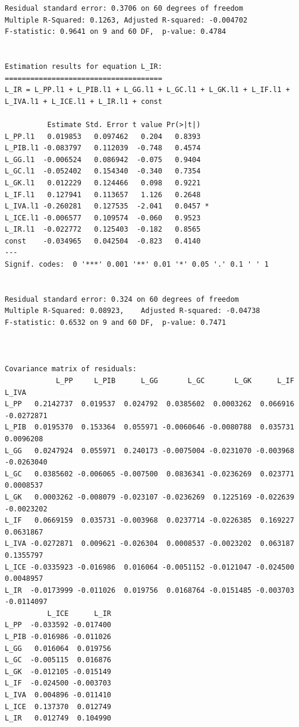 \documentclass[
  spanish,
  letterpaper,
  DIV=11,
  numbers=noendperiod]{scrartcl}
\begin{document}
\begin{verbatim}
Residual standard error: 0.3706 on 60 degrees of freedom
Multiple R-Squared: 0.1263, Adjusted R-squared: -0.004702 
F-statistic: 0.9641 on 9 and 60 DF,  p-value: 0.4784 


Estimation results for equation L_IR: 
===================================== 
L_IR = L_PP.l1 + L_PIB.l1 + L_GG.l1 + L_GC.l1 + L_GK.l1 + L_IF.l1 + L_IVA.l1 + L_ICE.l1 + L_IR.l1 + const 

          Estimate Std. Error t value Pr(>|t|)  
L_PP.l1   0.019853   0.097462   0.204   0.8393  
L_PIB.l1 -0.083797   0.112039  -0.748   0.4574  
L_GG.l1  -0.006524   0.086942  -0.075   0.9404  
L_GC.l1  -0.052402   0.154340  -0.340   0.7354  
L_GK.l1   0.012229   0.124466   0.098   0.9221  
L_IF.l1   0.127941   0.113657   1.126   0.2648  
L_IVA.l1 -0.260281   0.127535  -2.041   0.0457 *
L_ICE.l1 -0.006577   0.109574  -0.060   0.9523  
L_IR.l1  -0.022772   0.125403  -0.182   0.8565  
const    -0.034965   0.042504  -0.823   0.4140  
---
Signif. codes:  0 '***' 0.001 '**' 0.01 '*' 0.05 '.' 0.1 ' ' 1


Residual standard error: 0.324 on 60 degrees of freedom
Multiple R-Squared: 0.08923,    Adjusted R-squared: -0.04738 
F-statistic: 0.6532 on 9 and 60 DF,  p-value: 0.7471 



Covariance matrix of residuals:
            L_PP     L_PIB      L_GG       L_GC       L_GK      L_IF      L_IVA
L_PP   0.2142737  0.019537  0.024792  0.0385602  0.0003262  0.066916 -0.0272871
L_PIB  0.0195370  0.153364  0.055971 -0.0060646 -0.0080788  0.035731  0.0096208
L_GG   0.0247924  0.055971  0.240173 -0.0075004 -0.0231070 -0.003968 -0.0263040
L_GC   0.0385602 -0.006065 -0.007500  0.0836341 -0.0236269  0.023771  0.0008537
L_GK   0.0003262 -0.008079 -0.023107 -0.0236269  0.1225169 -0.022639 -0.0023202
L_IF   0.0669159  0.035731 -0.003968  0.0237714 -0.0226385  0.169227  0.0631867
L_IVA -0.0272871  0.009621 -0.026304  0.0008537 -0.0023202  0.063187  0.1355797
L_ICE -0.0335923 -0.016986  0.016064 -0.0051152 -0.0121047 -0.024500  0.0048957
L_IR  -0.0173999 -0.011026  0.019756  0.0168764 -0.0151485 -0.003703 -0.0114097
          L_ICE      L_IR
L_PP  -0.033592 -0.017400
L_PIB -0.016986 -0.011026
L_GG   0.016064  0.019756
L_GC  -0.005115  0.016876
L_GK  -0.012105 -0.015149
L_IF  -0.024500 -0.003703
L_IVA  0.004896 -0.011410
L_ICE  0.137370  0.012749
L_IR   0.012749  0.104990


\end{verbatim}
\end{document}
